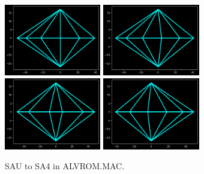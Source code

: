 \begin{figure}[H]
  \centering
        \includegraphics[width=4.22cm]{src/tempest_unused/SAU.png}%
        \hspace{0.2cm}
        \includegraphics[width=4.22cm]{src/tempest_unused/SA2.png}%
        \hspace{0.2cm}
        \includegraphics[width=4.22cm]{src/tempest_unused/SA3.png}%
        \hspace{0.2cm}
        \includegraphics[width=4.22cm]{src/tempest_unused/SA4.png}%
  \caption*{SAU to SA4 in ALVROM.MAC.}
\end{figure}

